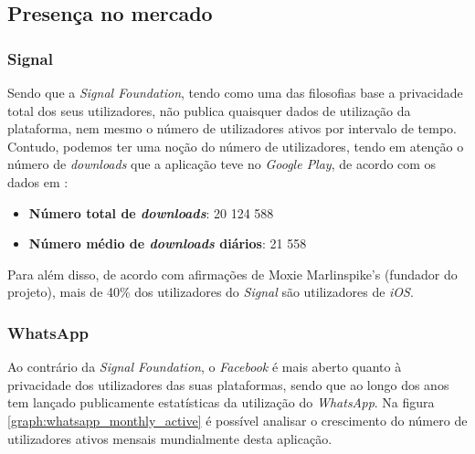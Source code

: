 \subsection{Presença no mercado}

\subsubsection{Signal}
Sendo que a \textit{Signal Foundation}, tendo como uma das filosofias base a privacidade total dos seus utilizadores, não publica quaisquer dados de utilização da plataforma, nem mesmo o número de utilizadores ativos por intervalo de tempo. Contudo, podemos ter uma noção do número de utilizadores, tendo em atenção o número de \textit{downloads} que a aplicação teve no \textit{Google Play}, de acordo com os dados em 
\cite{signal_android}:

\begin{itemize}
   \item \textbf{Número total de \textit{downloads}}: 20 124 588
   \item \textbf{Número médio de \textit{downloads} diários}: 21 558
\end{itemize}

Para além disso, de acordo com afirmações de Moxie Marlinspike's (fundador do projeto), mais de 40\% dos utilizadores do \textit{Signal} são utilizadores de \textit{iOS}. \cite{signal_ios}

\subsubsection{WhatsApp}
Ao contrário da \textit{Signal Foundation}, o \textit{Facebook} é mais aberto quanto à privacidade dos utilizadores das suas plataformas, sendo que ao longo dos anos tem lançado publicamente estatísticas da utilização do \textit{WhatsApp}. Na figura \ref{graph:whatsapp_monthly_active} é possível analisar o crescimento do número de utilizadores ativos mensais mundialmente desta aplicação.

